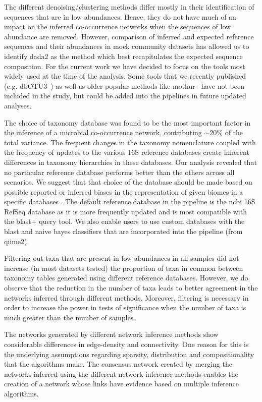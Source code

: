 The different denoising/clustering methods differ mostly in their identification of sequences that are in low abundances.
Hence, they do not have much of an impact on the inferred co-occurrence networks when the sequences of low abundance are removed.
However, comparison of inferred and expected reference sequences and their abundances in mock community datasets has allowed us to identify \ac{dada2} as the method which best recapitulates the expected sequence composition.
For the current work we have decided to focus on the tools most widely used at the time of the analysis. Some tools that we recently published (e.g. dbOTU3~\cite{Olesen2017}) as well as older popular methods like mothur~\cite{Schloss2009} have not been included in the study, but could be added into the pipelines in future updated analyses.

The choice of taxonomy database was found to be the most important factor in the inference of a microbial co-occurrence network, contributing $\sim20\%$ of the total variance.
The frequent changes in the taxonomy nomenclature coupled with the frequency of updates to the various 16S reference databases create inherent differences \cite{Balvociute2017} in taxonomy hierarchies in these databases.
Our analysis revealed that no particular reference database performs better than the others across all scenarios. We suggest that that choice of the database should be made based on possible reported or inferred biases in the representation of given biomes in a specific databases \cite{Balvociute2017}.
The default reference database in the pipeline is the \ac{ncbi} 16S RefSeq database as it is more frequently updated and is most compatible with the blast+ query tool.
We also enable users to use custom databases \cite{Griffen2011,Ritari2015} with the blast and naive bayes classifiers that are incorporated into the pipeline (from \ac{qiime2}).

Filtering out taxa that are present in low abundances in all samples did not increase (in most datasets tested) the proportion of taxa in common between taxonomy tables generated using different reference databases.
However, we do observe that the reduction in the number of taxa leads to better agreement in the networks inferred through different methods.
Moreover, filtering is necessary in order to increase the power in tests of significance when the number of taxa is much greater than the number of samples.

The networks generated by different network inference methods show considerable differences in edge-density and connectivity.
One reason for this is the underlying assumptions regarding sparsity, distribution and compositionality that the algorithms make.
The consensus network created by merging the networks inferred using the different network inference methods enables the creation of a network whose links have evidence based on multiple inference algorithms.


